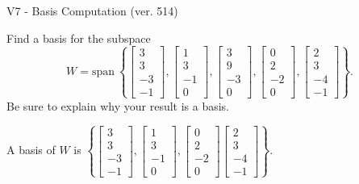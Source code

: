 \begin{exercise}
  \begin{exerciseTitle}V7 - Basis Computation (ver. 514)\end{exerciseTitle}
  \begin{exerciseStatement}
    Find a basis for the subspace 
\[W=\mathrm{span}\ \left\{\left[\begin{array}{r}
3 \\
3 \\
-3 \\
-1
\end{array}\right] , \left[\begin{array}{r}
1 \\
3 \\
-1 \\
0
\end{array}\right] , \left[\begin{array}{r}
3 \\
9 \\
-3 \\
0
\end{array}\right] , \left[\begin{array}{r}
0 \\
2 \\
-2 \\
0
\end{array}\right] , \left[\begin{array}{r}
2 \\
3 \\
-4 \\
-1
\end{array}\right]\right\}.\]
 Be sure to explain why your result is a basis.


  \end{exerciseStatement}
  \begin{exerciseAnswer}
   A basis of \(W\) is  \(\left\{\left[\begin{array}{r}
3 \\
3 \\
-3 \\
-1
\end{array}\right] , \left[\begin{array}{r}
1 \\
3 \\
-1 \\
0
\end{array}\right] , \left[\begin{array}{r}
0 \\
2 \\
-2 \\
0
\end{array}\right] \left[\begin{array}{r}
2 \\
3 \\
-4 \\
-1
\end{array}\right]\right\}\).
  


  \end{exerciseAnswer}
\end{exercise}
